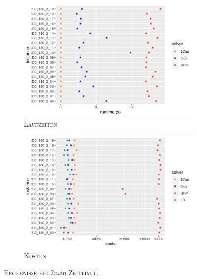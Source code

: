 \begin{figure}[H]
\centering
\begin{subfigure}[b]{0.47\textwidth}
\centering
\includegraphics[width=1.1\textwidth]{img/solver_instance_time_b=2_m_120s.png}
\caption{\textsc{Laufzeiten}}
\label{fig:b=2_m_runtimes}
\end{subfigure}
\hfill
\begin{subfigure}[b]{0.47\textwidth}
\centering
\includegraphics[width=1.1\textwidth]{img/solver_instance_cost_b=2_m_120s.png}
\caption{\textsc{Kosten}}
\label{fig:b=2_m_costs}
\end{subfigure}
\caption{\textsc{Ergebnisse bei $2min$ Zeitlimit}.}
\label{fig:res_plots_b=2_m}
\end{figure}

